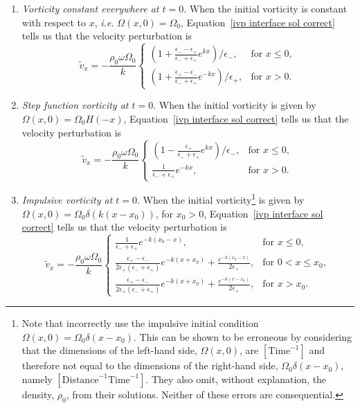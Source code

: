 \begin{enumerate}
	\item \label{IC1} \textit{Vorticity constant everywhere at $t = 0$}. When the initial vorticity is constant with respect to $x$, \textit{i.e.} $\Omega(x,0) = \Omega_0$, Equation~\eqref{ivp interface sol correct} tells us that the velocity perturbation is	\begin{equation}
	\tilde{v}_x = -\frac{\rho_0\omega\Omega_0}{k}
	\begin{cases}
	\left(1 + \frac{\epsilon_- - \epsilon_+}{\epsilon_- + \epsilon_+}e^{kx}\right)/\epsilon_-, & \text{for } x \leq 0, \\
	\left(1 + \frac{\epsilon_+ - \epsilon_-}{\epsilon_- + \epsilon_+}e^{-kx}\right)/\epsilon_+, & \text{for } x > 0.
	\end{cases}
	\end{equation}
	\item \label{IC2} \textit{Step function vorticity at $t = 0$}. When the initial vorticity is given by $\Omega(x,0) = \Omega_0H(-x)$, Equation~\eqref{ivp interface sol correct} tells us that the velocity perturbation is
	\begin{equation}
	\tilde{v}_x = -\frac{\rho_0\omega\Omega_0}{k}
	\begin{cases}
	\left(1 - \frac{\epsilon_+}{\epsilon_- + \epsilon_+}e^{kx}\right)/\epsilon_-, & \text{for } x \leq 0, \\
	\frac{1}{\epsilon_- + \epsilon_+}e^{-kx}, & \text{for } x > 0.
	\end{cases}
	\end{equation}
	\item  \label{IC3} \textit{Impulsive vorticity at $t = 0$}. When the initial vorticity\footnote{Note that \cite{rae_etal81} incorrectly use the impulsive initial condition $\Omega(x,0) = \Omega_0\delta(x-x_0)$. This can be shown to be erroneous by considering that the dimensions of the left-hand side, $\Omega(x,0)$, are $[\mathrm{Time}^{-1}]$ and therefore not equal to the dimensions of the right-hand side, $\Omega_0\delta(x-x_0)$, namely $[\mathrm{Distance}^{-1}\mathrm{Time}^{-1}]$. They also omit, without explanation, the density, $\rho_0$, from their solutions. Neither of these errors are consequential.} is given by {$\Omega(x,0) = \Omega_0\delta(k(x-x_0))$}, for $x_0>0$, Equation~\eqref{ivp interface sol correct} tells us that the velocity perturbation is
	\begin{equation}
	\tilde{v}_x = -\frac{\rho_0\omega\Omega_0}{k}
	\begin{cases}
	\frac{1}{\epsilon_- + \epsilon_+}e^{-k(x_0 - x)}, & \text{for } x \leq 0, \\
	\frac{\epsilon_+ - \epsilon_-}{2\epsilon_+(\epsilon_- + \epsilon_+)}e^{-k(x + x_0)} + \frac{e^{-k(x_0 - x)}}{2\epsilon_+}, & \text{for } 0 < x \leq x_0, \\
	\frac{\epsilon_+ - \epsilon_-}{2\epsilon_+(\epsilon_- + \epsilon_+)}e^{-k(x + x_0)} + \frac{e^{-k(x - x_0)}}{2\epsilon_+}, & \text{for } x > x_0.
	\end{cases}
	\end{equation}
\end{enumerate}
